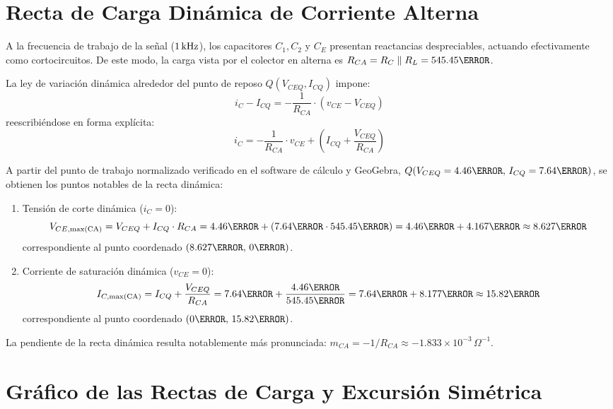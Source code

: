 \section{Recta de Carga Dinámica de Corriente Alterna}

A la frecuencia de trabajo de la señal ($1\,\mathrm{kHz}$), los capacitores $C_1, C_2$ y $C_E$ presentan reactancias despreciables,
actuando efectivamente como cortocircuitos. De este modo, la carga vista por el colector en alterna es $R_{CA} = R_C \parallel R_L = 545.45\ohm$.

La ley de variación dinámica alrededor del punto de reposo $Q(V_{CEQ}, I_{CQ})$ impone:
\begin{equation}
  i_C - I_{CQ} = -\frac{1}{R_{CA}} \cdot (v_{CE} - V_{CEQ})
\end{equation}
reescribiéndose en forma explícita:
\begin{equation}
  i_C = -\frac{1}{R_{CA}} \cdot v_{CE} + \left(I_{CQ} + \frac{V_{CEQ}}{R_{CA}}\right)
  \label{eq:recta_ca}
\end{equation}

A partir del punto de trabajo normalizado verificado en el software de cálculo y GeoGebra, $Q(V_{CEQ} = 4.46\V,\, I_{CQ} = 7.64\mA)$,
se obtienen los puntos notables de la recta dinámica:
\begin{enumerate}
  \item Tensión de corte dinámica ($i_C = 0$):
    \begin{equation}
      V_{CE,\max(\text{CA})} = V_{CEQ} + I_{CQ} \cdot R_{CA} = 4.46\V + (7.64\mA \cdot 545.45\ohm) = 4.46\V + 4.167\V \approx 8.627\V
    \end{equation}
    correspondiente al punto coordenado $(8.627\V,\, 0\mA)$.
  \item Corriente de saturación dinámica ($v_{CE} = 0$):
    \begin{equation}
      I_{C,\max(\text{CA})} = I_{CQ} + \frac{V_{CEQ}}{R_{CA}} = 7.64\mA + \frac{4.46\V}{545.45\ohm} = 7.64\mA + 8.177\mA \approx 15.82\mA
    \end{equation}
    correspondiente al punto coordenado $(0\V,\, 15.82\mA)$.
\end{enumerate}

La pendiente de la recta dinámica resulta notablemente más pronunciada: $m_{CA} = -1/R_{CA} \approx -1.833 \times 10^{-3}\,\Omega^{-1}$.

\section{Gráfico de las Rectas de Carga y Excursión Simétrica}

